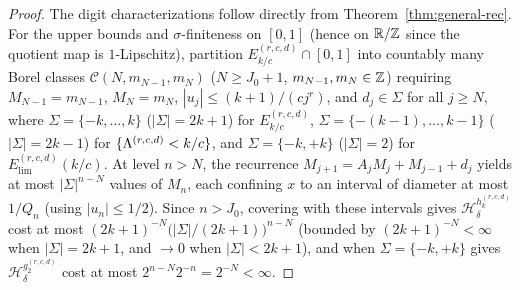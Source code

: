 \begin{proof}
The digit characterizations follow directly from Theorem~\ref{thm:general-rec}.
For the upper bounds and $\sigma$-finiteness on $[0,1]$ (hence on $\mathbb{R}/\mathbb{Z}$ since
the quotient map is $1$-Lipschitz), partition $E_{k/c}^{(r,c,d)}\cap[0,1]$ into
countably many Borel classes $\mathcal C(N,m_{N-1},m_N)$ ($N\ge J_0+1$,
$m_{N-1},m_N\in\mathbb{Z}$) requiring $M_{N-1}=m_{N-1}$, $M_N=m_N$,
$|u_j|\le(k+1)/(cj^r)$, and $d_j\in\Sigma$ for all $j\ge N$, where
$\Sigma=\{-k,\dots,k\}$ ($|\Sigma|=2k+1$) for $E_{k/c}^{(r,c,d)}$,
$\Sigma=\{-(k-1),\dots,k-1\}$ ($|\Sigma|=2k-1$) for $\{\Lambda^{(r,c,d)}<k/c\}$,
and $\Sigma=\{-k,+k\}$ ($|\Sigma|=2$) for $E_{\mathrm{lim}}^{(r,c,d)}(k/c)$.
At level $n>N$, the recurrence $M_{j+1}=A_jM_j+M_{j-1}+d_j$ yields at most
$|\Sigma|^{n-N}$ values of $M_n$, each confining $x$ to an interval of diameter
at most $1/Q_n$ (using $|u_n|\le1/2$). Since $n>J_0$, covering with these
intervals gives $\mathcal H_\delta^{h_k^{(r,c,d)}}$ cost at most
$(2k+1)^{-N}\bigl(|\Sigma|/(2k+1)\bigr)^{n-N}$ (bounded by $(2k+1)^{-N}<\infty$
when $|\Sigma|=2k+1$, and $\to0$ when $|\Sigma|<2k+1$), and when $\Sigma=\{-k,+k\}$
gives $\mathcal H_\delta^{g_2^{(r,c,d)}}$ cost at most $2^{n-N}2^{-n}=2^{-N}<\infty$.


\end{proof}
